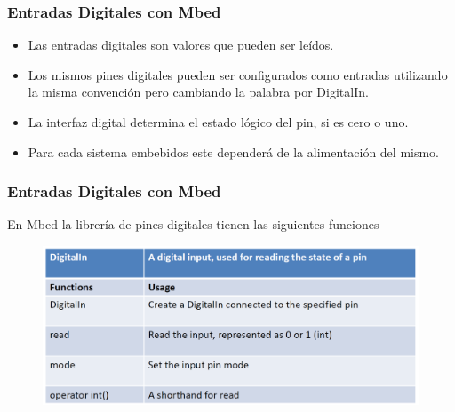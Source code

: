 \documentclass[10.5pt,scale=1.0,t,aspectratio=169,hyperref={pdfpagelabels=false}]{beamer}
\begin{document}
\begin{frame}
	\frametitle{Entradas Digitales con Mbed}
	\begin{itemize}
		\item Las entradas digitales son valores que pueden ser leídos.
		\item Los mismos pines digitales pueden ser configurados como entradas utilizando la misma convención pero cambiando la palabra por DigitalIn.  
		\item La interfaz digital determina el estado lógico del pin, si es cero o uno.
		\item Para cada sistema embebidos este dependerá de la alimentación del mismo. 
	\end{itemize}
\end{frame}
\begin{frame}
	\frametitle{Entradas Digitales con Mbed}
	En Mbed la librería de pines digitales tienen las siguientes funciones
	\begin{figure}
		\centering
		\includegraphics[scale=0.5]{05_DigitalInFunctions}
	\end{figure}
\end{frame}
\end{document}
